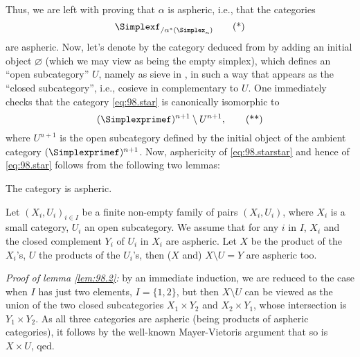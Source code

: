 Thus, we are left with proving that $\alpha$ is aspheric, i.e., that
the categories
\begin{equation}
  \label{eq:98.star}
  \Simplexf_{/\alpha^*(\Simplex_n)}\tag{*}
\end{equation}
are aspheric. Now, let's denote by \Simplexprimef{} the category
deduced from \Simplexf{} by adding an initial object $\varnothing$
(which we may view as being the empty simplex), which defines an
``open subcategory'' $U$, namely as sieve in \Simplexprimef, in such a
way that \Simplexf{} appears as the ``closed subcategory'', i.e.,
cosieve in \Simplexprimef{} complementary to $U$. One immediately
checks that the category \eqref{eq:98.star} is canonically isomorphic
to
\begin{equation}
  \label{eq:98.starstar}
  (\Simplexprimef)^{n+1} \setminus U^{n+1},\tag{**}
\end{equation}
where $U^{n+1}$ is the open subcategory defined by the initial object
of the ambient category $(\Simplexprimef)^{n+1}$. Now, asphericity of
\eqref{eq:98.starstar} and hence of \eqref{eq:98.star} follows from
the following two lemmas:
\begin{lemmanum}\label{lem:98.1}
  The category \Simplexf{} is aspheric.
\end{lemmanum}
\begin{lemmanum}\label{lem:98.2}
  Let $(X_i,U_i)_{i\in I}$ be a finite non-empty family of pairs
  $(X_i,U_i)$, where $X_i$ is a small category, $U_i$ an open
  subcategory. We assume that for any $i$ in $I$, $X_i$ and the closed
  complement $Y_i$ of $U_i$ in $X_i$ are aspheric. Let $X$ be the
  product of the $X_i$'s, $U$ the products of the $U_i$'s,
  then \textup($X$ and\textup) $X\setminus U=Y$ are aspheric too.
\end{lemmanum}
\noindent\emph{Proof of lemma \ref{lem:98.2}:} by an immediate
induction, we are reduced to the case when $I$ has just two elements,
$I=\{1,2\}$, but then $X\setminus U$ can be viewed as the union of the
two closed subcategories $X_1\times Y_2$ and $X_2\times Y_1$, whose
intersection is $Y_1\times Y_2$. As all three categories are aspheric
(being products of aspheric categories), it follows by the well-known
Mayer-Vietoris argument that so is $X\times U$, qed.

